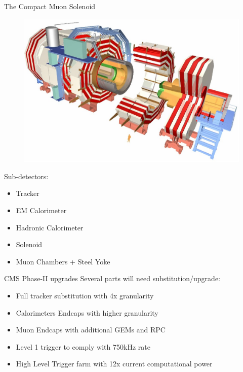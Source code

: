 \documentclass{beamer}
\begin{document}
\begin{frame}{The Compact Muon Solenoid}
\begin{figure}
\begin{center}
\includegraphics[scale=0.8]{images/cms.jpg}
\end{center}
\end{figure}
\begin{center}
Sub-detectors:
\begin{itemize}
\item Tracker
\item EM Calorimeter
\item Hadronic Calorimeter
\item Solenoid
\item Muon Chambers + Steel Yoke
\end{itemize}
\end{center}
\end{frame}

\begin{frame}{CMS Phase-II upgrades}
Several parts will need substitution/upgrade:
\begin{itemize}
\item Full tracker substitution with 4x granularity
\item Calorimeters Endcaps with higher granularity
\item Muon Endcaps with additional GEMs and RPC
\item Level 1 trigger to comply with 750kHz rate
\item High Level Trigger farm with 12x current computational power
\end{itemize}
\end{frame}
\end{document}
